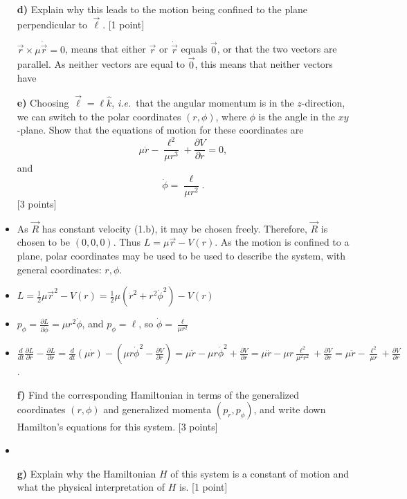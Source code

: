 \documentclass[11pt,a4paper]{report}
\newcounter{excount}[chapter]
\newenvironment{exercise}[1][]{\addtocounter{excount}{1} \noindent {\bf Question
    \arabic{excount} \ \ #1}\hspace{2mm}}{\vspace{4mm}}
\begin{document}
\begin{exercise}{\bf Central potentials\\}
\begin{itemize}
\item[{\bf d)}] Explain why this leads to the motion being confined to the plane perpendicular to $\vec\ell$. [1 point]

$\vec{r} \times \mu \dot{\vec{r}}=0$, means that either $\vec{r} $ or $\dot{\vec{r}}$ equals $\vec{0}$, or that the two vectors are parallel. As neither vectors are equal to $\vec{0}$, this means that neither vectors have


\item[{\bf e)}] Choosing $\vec\ell= \ell\hat k$, {\it i.e.}\ that the angular momentum is in the $z$-direction, we can switch to the polar coordinates $(r,\phi)$, where $\phi$ is the angle in the $xy$-plane. Show that the equations of motion for these coordinates are
\begin{equation}
\mu\ddot r-\frac{\ell^2}{\mu r^3}+\frac{\partial V}{\partial r}=0,\label{eq:LEQ_r}
\end{equation}
and
\begin{equation}
\dot\phi=\frac{\ell}{\mu r^2}\label{eq:LEQ_phi}.
\end{equation}
[3 points]

\item As $\vec{R}$ has constant velocity (1.b), it may be chosen freely. Therefore, $\vec{R}$ is chosen to be $(0,0,0)$. Thus $L=\mu \vec{r}-V(r)$. As the motion is confined to a plane, polar coordinates may be used to be used to describe the system, with general coordinates: $r, \phi$.

\item $L=\frac{1}{2}\mu \vec{r}^2-V(r)=\frac{1}{2}\mu (\dot{r}^2+r^2\dot{\phi}^2)-V(r)$
\item $p_{\phi}=\frac{\partial L}{\partial \dot{\phi}}=\mu r^2 \dot{\phi}$, and $p_{\phi}=\ell$, so $\dot{\phi}=\frac{\ell}{\mu r^2}$
\item $\frac{d}{dt}\frac{\partial L}{\partial \dot{r}}-\frac{\partial L}{\partial r}=\frac{d}{dt}(\mu\dot{r})-(\mu r \dot{\phi}^2-\frac{\partial V}{\partial r})=\mu\ddot{r}-\mu r \dot{\phi}^2+\frac{\partial V}{\partial r}=\mu\ddot{r}-\mu r \frac{\ell^2}{\mu^2 r^2}+\frac{\partial V}{\partial r}=\mu\ddot{r}-\frac{\ell^2}{\mu r}+\frac{\partial V}{\partial r}$. 



\item[{\bf f)}] Find the corresponding Hamiltonian in terms of the generalized coordinates $(r,\phi)$ and generalized momenta $(p_r,p_\phi)$, and write down Hamilton's equations for this system.  [3 points]

\item


\item[{\bf g)}] Explain why the Hamiltonian $H$ of this system is a constant of motion and what the physical interpretation of $H$ is. [1 point]
\end{itemize}
\end{exercise}
\end{document}
